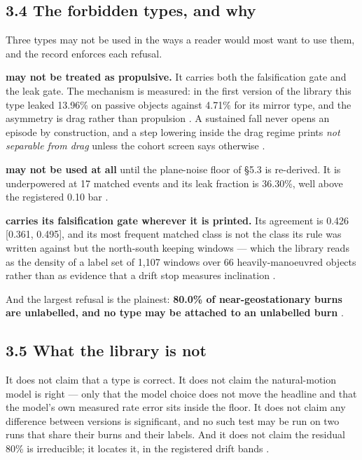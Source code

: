 \documentclass[11pt]{article}
\begin{document}
\subsection*{3.4 The forbidden types, and why}

Three types may not be used in the ways a reader would most want to use them, and the record enforces each refusal.

\textbf{ may not be treated as propulsive.} It carries both the falsification gate and the leak gate. The mechanism is measured: in the first version of the library this type leaked 13.96\% on passive objects against 4.71\% for its mirror type, and the asymmetry is drag rather than propulsion%
. A sustained fall never opens an episode by construction, and a step lowering inside the drag regime prints \emph{not separable from drag} unless the cohort screen says otherwise%
.

\textbf{ may not be used at all} until the plane-noise floor of \S{}5.3 is re-derived. It is underpowered at 17 matched events and its leak fraction is 36.30\%, well above the registered 0.10 bar%
.

\textbf{ carries its falsification gate wherever it is printed.} Its agreement is 0.426 [0.361, 0.495], and its most frequent matched class is not the class its rule was written against but the north-south keeping windows --- which the library reads as the density of a label set of 1,107 windows over 66 heavily-manoeuvred objects rather than as evidence that a drift stop measures inclination%
.

And the largest refusal is the plainest: \textbf{80.0\% of near-geostationary burns are unlabelled, and no type may be attached to an unlabelled burn}%
.

\subsection*{3.5 What the library is not}

It does not claim that a type is correct. It does not claim the natural-motion model is right --- only that the model choice does not move the headline and that the model's own measured rate error sits inside the floor. It does not claim any difference between versions is significant, and no such test may be run on two runs that share their burns and their labels. And it does not claim the residual 80\% is irreducible; it locates it, in the registered drift bands%
.
\end{document}
